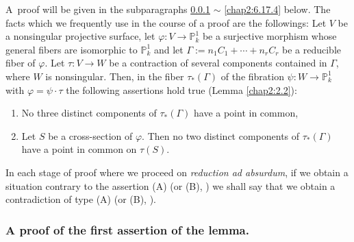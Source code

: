 A\pageoriginale\ proof will be given in the subparagraphs \ref{chap2:6.17.1}
$\sim$ \ref{chap2:6.17.4} below. The facts which we frequently use in the
course of a proof are the followings: Let $V$ be a nonsingular
projective surface, let $\varphi:V\to \mathbb{P}^{1}_{k}$ be a
surjective morphism whose general fibers are isomorphic to
$\mathbb{P}^{1}_{k}$ and let $\Gamma:=n_{1}C_{1}+\cdots+n_{r}C_{r}$ be
a reducible fiber of $\varphi$. Let $\tau:V\to W$ be a contraction of
several components contained in $\Gamma$, where $W$ is
nonsingular. Then, in the fiber $\tau_{\ast}(\Gamma)$ of the fibration
$\psi:W\to \mathbb{P}^{1}_{k}$ with $\varphi=\psi\cdot\tau$ the
following assertions hold true (\cf Lemma \ref{chap2:2.2}):
\begin{enumerate}
\renewcommand{\theenumi}{\Alph{enumi}}
\renewcommand{\labelenumi}{(\theenumi)}
\item No three distinct components of $\tau_{\ast}(\Gamma)$ have a
  point in common,

\item Let $S$ be a cross-section of $\varphi$. Then no two distinct
  components of $\tau_{\ast}(\Gamma)$ have a point in common on $\tau(S)$.
\end{enumerate}

In each stage of proof where we proceed on {\em reduction ad absurdum},
if we obtain a situation contrary to the assertion (A) (or (B), \resp)
we shall say that we obtain a contradiction of type (A) (or (B),
\resp).

\subsubsection{A proof of the first assertion of the lemma.}\label{chap2:6.17.1}

